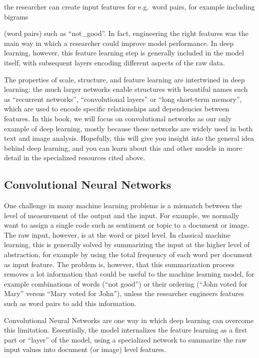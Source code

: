 the researcher can create input features for e.g.\ word pairs, for example including bigrams { (word pairs) such as ``not\_good''.
In fact, engineering the right features was the main way in which a researcher could improve model performance.
In deep learning, however, this feature learning step is generally included in the model itself,
with subsequent layers encoding different aspects of the raw data.

The properties of scale, structure, and feature learning are intertwined in deep learning: the much larger networks enable structures with beautiful names such as ``recurrent networks'', ``convolutional layers'' or ``long short-term memory'',
which are used to encode specific relationships and dependencies between features.
In this book, we will focus on convolutional networks as our only example of deep learning,
mostly because these networks are widely used in both text and image analysis.
Hopefully, this will give you insight into the general idea behind deep learning,
and you can learn about this and other models in more detail in the specialized resources cited above.

\subsection{Convolutional Neural Networks}
\label{sec:cnnbasis}

One challenge in many machine learning problems is a mismatch between the level of measurement of the output and the input.
For example, we normally want to  assign a single code such as sentiment or topic to a document or image.
The raw input, however, is at the word or pixel level.
In classical machine learning, this is generally solved by summarizing the input at the higher level of abstraction,
for example by using the total frequency of each word per document as input feature.
The problem is, however, that this summarization process removes a lot information that could be useful to the machine learning model,
for example combinations of words (``not good'') or their ordering (``John voted for Mary'' versus ``Mary voted for John''),
unless the researcher engineers features such as word pairs to add this information.

Convolutional Neural Networks are one way in which deep learning can overcome this limitation.
Essentially, the model internalizes the feature learning as a first part or ``layer'' of the model,
using a specialized network to summarize the raw input values into document (or image) level features.

}
